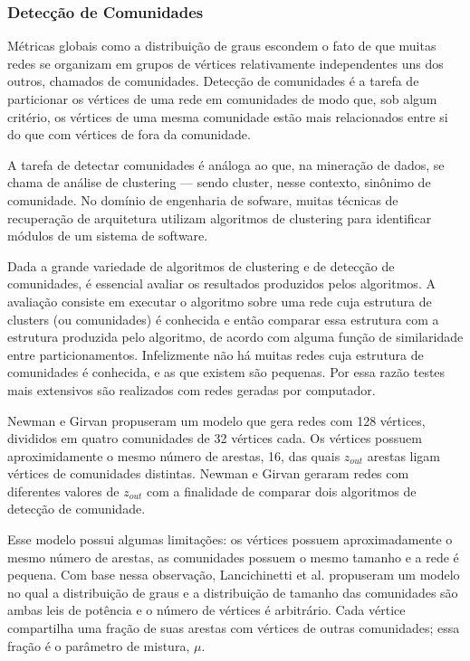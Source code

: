 \documentclass{article}
\begin{document}

\subsubsection{Detecção de Comunidades}

Métricas globais como a distribuição de graus escondem o fato de que muitas redes se organizam em grupos de vértices relativamente independentes uns dos outros, chamados de comunidades. Detecção de comunidades é a tarefa de particionar os vértices de uma rede em comunidades de modo que, sob algum critério, os vértices de uma mesma comunidade estão mais relacionados entre si do que com vértices de fora da comunidade.

A tarefa de detectar comunidades é análoga ao que, na mineração de dados, se chama de análise de clustering --- sendo cluster, nesse contexto, sinônimo de comunidade. No domínio de engenharia de sofware, muitas técnicas de recuperação de arquitetura utilizam algoritmos de clustering para identificar módulos de um sistema de software.

Dada a grande variedade de algoritmos de clustering e de detecção de comunidades, é essencial avaliar os resultados produzidos pelos algoritmos. A avaliação consiste em executar o algoritmo sobre uma rede cuja estrutura de clusters (ou comunidades) é conhecida e então comparar essa estrutura com a estrutura produzida pelo algoritmo, de acordo com alguma função de similaridade entre particionamentos. Infelizmente não há muitas redes cuja estrutura de comunidades é conhecida, e as que existem são pequenas. Por essa razão testes mais extensivos são realizados com redes geradas por computador.

Newman e Girvan \citeyear{Newman2004a} propuseram um modelo que gera redes com 128 vértices, divididos em quatro comunidades de 32 vértices cada. Os vértices possuem aproximidamente o mesmo número de arestas, 16, das quais $z_{out}$ arestas ligam vértices de comunidades distintas. Newman e Girvan geraram redes com diferentes valores de $z_{out}$ com a finalidade de comparar dois algoritmos de detecção de comunidade.

Esse modelo possui algumas limitações: os vértices possuem aproximadamente o mesmo número de arestas, as comunidades possuem o mesmo tamanho e a rede é pequena. Com base nessa observação, Lancichinetti et al. \citeyear{Lancichinetti2008} propuseram um modelo no qual a distribuição de graus e a distribuição de tamanho das comunidades são ambas leis de potência e o número de vértices é arbitrário. Cada vértice compartilha uma fração de suas arestas com vértices de outras comunidades; essa fração é o parâmetro de mistura, $\mu$.
\end{document}
